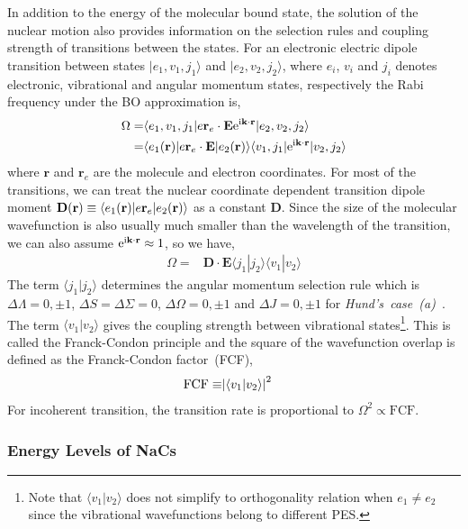 In addition to the energy of the molecular bound state,
the solution of the nuclear motion also provides information on the selection rules
and coupling strength of transitions between the states.
For an electronic electric dipole transition between states
$|e_1,v_1,j_1\rangle$ and $|e_2,v_2,j_2\rangle$,
where $e_i$, $v_i$ and $j_i$ denotes electronic, vibrational and angular momentum states,
respectively the Rabi frequency under the BO approximation is,
\begin{align*}
  \Omega=&\langle e_1,v_1,j_1|e\mathbf{r}_e\cdot\mathbf{E}\mathrm{e}^{\mathrm{i}\mathbf{k}\cdot\mathbf{r}}|e_2,v_2,j_2\rangle\\
  =&\langle e_1(\mathbf{r})|e\mathbf{r}_e\cdot\mathbf{E}|e_2(\mathbf{r})\rangle\langle v_1,j_1|\mathrm{e}^{\mathrm{i}\mathbf{k}\cdot\mathbf{r}}|v_2,j_2\rangle
\end{align*}
where $\mathbf{r}$ and $\mathbf{r}_e$ are the molecule and electron coordinates.
For most of the transitions, we can treat the nuclear coordinate dependent transition dipole
moment $\mathbf{D}{\left({\mathbf{r}}\right)}\equiv\langle e_1(\mathbf{r})|e\mathbf{r}_e|e_2(\mathbf{r})\rangle$ as a constant $\mathbf{D}$.
Since the size of the molecular wavefunction is also usually much smaller than
the wavelength of the transition, we can also assume $\mathrm{e}^{\mathrm{i}\mathbf{k}\cdot\mathbf{r}}\approx 1$,
so we have,
\begin{align*}
  \Omega=&\mathbf{D}\cdot\mathbf{E}\langle j_1|j_2\rangle\langle v_1|v_2\rangle
\end{align*}
The term $\langle j_1|j_2\rangle$ determines the angular momentum selection rule which is
$\Delta\Lambda=0,\pm1$, $\Delta S=\Delta\Sigma=0$, $\Delta\Omega=0,\pm1$ and $\Delta J=0,\pm1$
for \textit{Hund's~case~(a)}~\cite[p.~14-15]{straughan_spectroscopy_1976}.
The term $\langle v_1|v_2\rangle$ gives the coupling strength between vibrational states\footnote{
  Note that $\langle v_1|v_2\rangle$ does not simplify to orthogonality relation
  when $e_1\neq e_2$ since the vibrational wavefunctions belong to different PES.}.
This is called the Franck-Condon principle and the square of the wavefunction overlap
is defined as the Franck-Condon factor~(FCF),
\begin{align*}
  \mathrm{FCF}\equiv&{\left|{\langle v_1|v_2\rangle}\right|}^2
\end{align*}
For incoherent transition, the transition rate is proportional to $\Omega^2\propto\mathrm{FCF}$.

\subsubsection{Energy Levels of NaCs}

